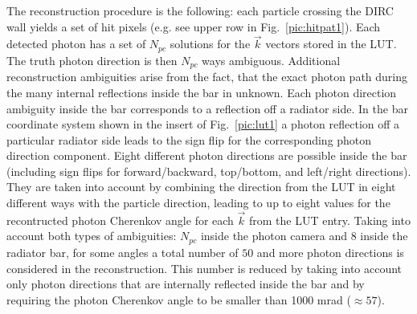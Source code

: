 The reconstruction procedure is the following: each particle crossing the DIRC wall yields a set of hit pixels (e.g. see upper row in Fig.~\ref{pic:hitpat1}). Each detected photon has a set of $N_{pc}$ solutions for the $\vec k$ vectors stored in the LUT. The truth photon direction is then $N_{pc}$ ways ambiguous. Additional reconstruction ambiguities arise from the fact, that the exact photon path during the many internal reflections inside the bar in unknown.  
Each photon direction ambiguity inside the bar corresponds to a reflection off a radiator side. In the bar coordinate system shown in the insert of Fig.~\ref{pic:lut1} a photon reflection off a particular radiator side leads to the sign flip for the corresponding photon direction component. Eight different photon directions are possible inside the bar (including sign flips for forward/backward, top/bottom, and left/right directions). They are taken into account by combining the direction from the LUT in eight different ways with the particle direction, leading to up to eight values for the recontructed photon Cherenkov angle for each $\vec k$ from the LUT entry.
Taking into account both types of ambiguities: $N_{pc}$ inside the photon camera and $8$ inside the radiator bar, for some angles a total number of $50$ and more photon directions is considered in the reconstruction.  This number is reduced by taking into account only photon directions that are internally reflected inside the bar and by requiring the photon Cherenkov angle to be smaller than 1000 mrad ($\approx 57$\mydeg).


